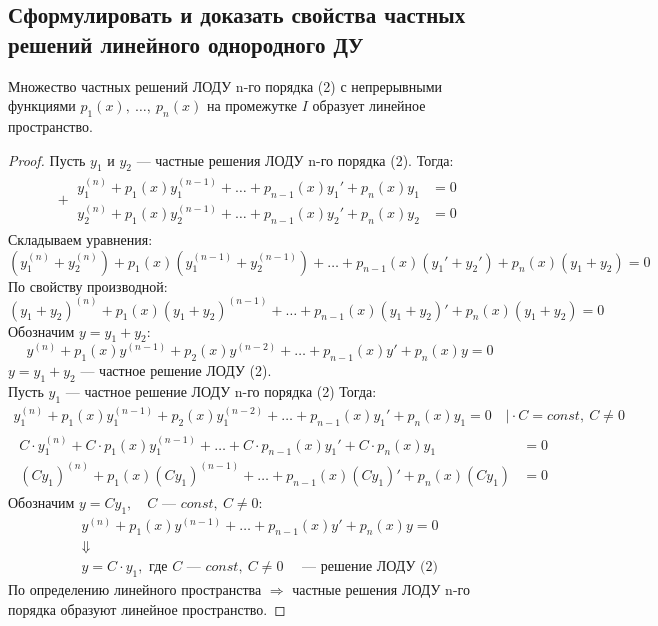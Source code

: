 \newpage
\subsection{Сформулировать и доказать свойства частных решений линейного однородного ДУ}

\begin{theorem*}
    Множество частных решений ЛОДУ n-го порядка (2) с непрерывными функциями $p_1(x),\ \ldots,\ p_n(x)$ на промежутке $I$ образует линейное пространство.
\end{theorem*}
\begin{proof}
    Пусть $y_1$ и $y_2$ --- частные решения ЛОДУ n-го порядка (2). Тогда:
    \begin{align*}
        +\ \begin{aligned}
            y_1^{(n)} + p_1(x)y_1^{(n-1)} + \ldots + p_{n-1}(x)y_1' + p_n(x)y_1 &= 0 \\ 
            y_2^{(n)} + p_1(x)y_2^{(n-1)} + \ldots + p_{n-1}(x)y_2' + p_n(x)y_2 &= 0
        \end{aligned}
    \end{align*}
    Складываем уравнения:
    \[
        \left(y_1^{(n)} + y_2^{(n)}\right) + p_1(x)\left(y_1^{(n-1)} + y_2^{(n-1)}\right) + \ldots + p_{n-1} (x) \left(y_1' + y_2'\right) + p_n(x)\left(y_1 + y_2\right)= 0
    \]
    По свойству производной:
    \[
        (y_1 + y_2)^{(n)} + p_1(x) (y_1 + y_2)^{(n-1)} + \ldots + p_{n-1}(x)(y_1 + y_2)' + p_n(x)(y_1 + y_2) = 0
    \]
    Обозначим $y = y_1 + y_2$:
    \[
        y^{(n)} + p_1(x)y^{(n-1)}  + p_2(x)y^{(n-2)} + \ldots + p_{n-1}(x)y' + p_n(x)y = 0
    \]
    $y = y_1 + y_2$ --- частное решение ЛОДУ (2). \\
    Пусть $y_1$ --- частное решение ЛОДУ n-го порядка (2)
    Тогда:
    \begin{gather*}
        y_1^{(n)} + p_1(x)y_1^{(n-1)}  + p_2(x)y_1^{(n-2)} + \ldots + p_{n-1}(x)y_1' + p_n(x)y_1 = 0\quad \Big| \cdot C = const,\ C \ne 0 \\
        \begin{aligned}
            C\cdot y_1^{(n)} + C\cdot p_1(x)y_1^{(n-1)} + \ldots + C\cdot p_{n-1}(x) y_1' + C\cdot p_n(x) y_1 &= 0 \\
            (C y_1)^{(n)} + p_1(x)(Cy_1)^{(n-1)} + \ldots + p_{n-1}(x)(C y_1)' + p_n(x)(C y_1) &= 0
        \end{aligned}
    \end{gather*}
    Обозначим $y = Cy_1,\quad C \text{ --- } const,\ C \ne 0$:
    \begin{gather*}
        y^{(n)} + p_1(x)y^{(n-1)} + \ldots + p_{n-1}(x)y' + p_n(x)y = 0 \\
        \Downarrow \\
        y = C\cdot y_1, \text{ где } C \text{ --- } const,\ C \ne 0\quad \text{ --- решение ЛОДУ (2)} 
    \end{gather*}
    По определению линейного пространства $\Rightarrow$ частные решения ЛОДУ n-го порядка образуют линейное пространство.
\end{proof}

